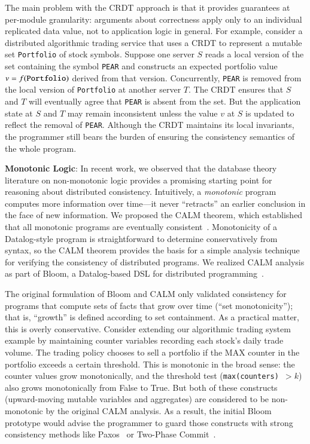 The main problem with the CRDT approach is that it provides guarantees at per-module granularity: arguments about correctness apply only to an individual replicated data value, not to application logic in
general. For example, consider a distributed algorithmic trading service that
uses a CRDT to represent a mutable set \texttt{Portfolio} of stock symbols. Suppose one server
$S$ reads a local version of the set containing the symbol \texttt{PEAR} and
constructs an expected portfolio value $v = f(\mbox{\texttt{Portfolio}})$
derived from that version. Concurrently, \texttt{PEAR} is removed from the local
version of \texttt{Portfolio} at another server $T$. The CRDT ensures that
$S$ and $T$ will eventually agree that \texttt{PEAR} is absent from the set. But
the application state at $S$ and $T$ may remain inconsistent unless the value
$v$ at $S$ is updated to reflect the removal of \texttt{PEAR}. Although the CRDT
maintains its local invariants, the programmer still bears the burden of ensuring
the consistency semantics of the whole program.

\vspace{0.5em} \noindent
\textbf{Monotonic Logic}: In recent work, we observed that the database theory
literature on non-monotonic logic provides a promising starting point for
reasoning about distributed consistency. Intuitively, a \emph{monotonic} program
computes more information over time---it never ``retracts'' an earlier
conclusion in the face of new information. We proposed the CALM
theorem, which established that all monotonic programs
are eventually consistent~\cite{Ameloot2011,Hellerstein2010,dedalus-pods12-tr}. Monotonicity of
a Datalog-style program is straightforward to determine conservatively from
syntax, so the CALM theorem provides the basis for a simple analysis technique
for verifying the consistency of distributed programs. We
realized CALM analysis as part of Bloom, a Datalog-based DSL for distributed
programming~\cite{Alvaro2011,bloom}.

The original formulation of Bloom and CALM only validated consistency for programs that compute sets of facts that grow over time (``set monotonicity''); that is, ``growth'' is defined according to set containment. As a practical matter, this is overly conservative.  Consider extending our algorithmic trading system example by maintaining counter variables recording each stock's daily trade volume. The trading policy chooses to sell a portfolio if the MAX counter in the portfolio exceeds a certain threshold.  This is monotonic in the broad sense: the counter values grow monotonically, and the threshold test (\texttt{max(counters) $> k$}) also grows monotonically from False to True.  But both of these constructs (upward-moving mutable variables and aggregates) are considered to be non-monotonic by the original CALM analysis.  As a result, the initial Bloom prototype would advise the programmer to guard those constructs with strong consistency methods like Paxos~\cite{Lamport1998} or Two-Phase Commit~\cite{Gray1978}. 

